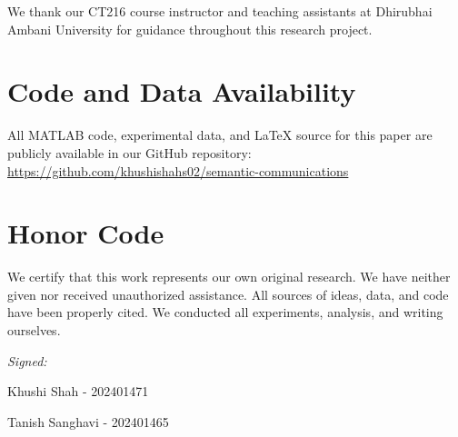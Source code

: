 \documentclass[conference]{IEEEtran}
\begin{document}
We thank our CT216 course instructor and teaching assistants at Dhirubhai 
Ambani University for guidance throughout this research project.

\section*{Code and Data Availability}

All MATLAB code, experimental data, and LaTeX source for this paper are 
publicly available in our GitHub repository:\\
\url{https://github.com/khushishahs02/semantic-communications}

\section*{Honor Code}

We certify that this work represents our own original research. We have 
neither given nor received unauthorized assistance. All sources of ideas, 
data, and code have been properly cited. We conducted all experiments, 
analysis, and writing ourselves.

\vspace{1em}
\noindent
\textit{Signed:}

\vspace{1em}
\noindent
Khushi Shah - 202401471

\vspace{0.5em}
\noindent
Tanish Sanghavi - 202401465
\end{document}
